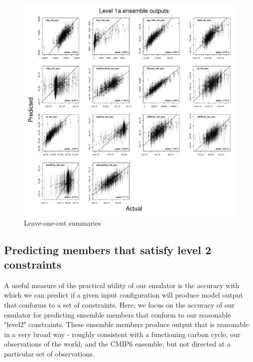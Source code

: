 \documentclass[gmd, manuscript]{copernicus}
\begin{document}
%
\begin{figure}[t]
\includegraphics[width=12cm]{./graphics/kmloostats_YAnom_level1a.pdf}
\caption{Leave-one-out summaries }
\label{fig:kmloostats_YAnom_level1a}
\end{figure}

\subsection{Predicting members that satisfy level 2 constraints}\label{app:level_2_pred} 

A useful measure of the practical utility of our emulator is the accuracy with which we can predict if a given input configuration will produce model output that conforms to a set of constraints. Here, we focus on the accuracy of our emulator for predicting ensemble members that conform to our reasonable "level2" constraints. These ensemble members produce output that is reasonable in a very broad way - roughly consistent with a functioning carbon cycle, our observations of the world, and the CMIP6 ensemble, but not directed at a particular set of observations.
\end{document}
